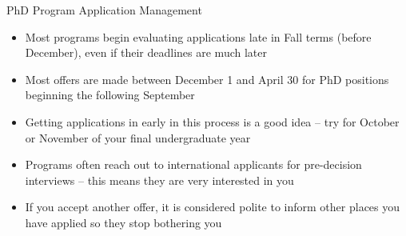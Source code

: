 \begin{frame}[fragile]{PhD Program Application Management}
    \begin{itemize}
        \item Most programs begin evaluating applications late in Fall terms (before December), even if their deadlines are much later
        \item Most offers are made between December 1 and April 30 for PhD positions beginning the following September
        \item Getting applications in early in this process is a good idea -- try for October or November of your final undergraduate year
        \item Programs often reach out to international applicants for pre-decision interviews -- this means they are very interested in you
        \item If you accept another offer, it is considered polite to inform other places you have applied so they stop bothering you
    \end{itemize}
\end{frame}


